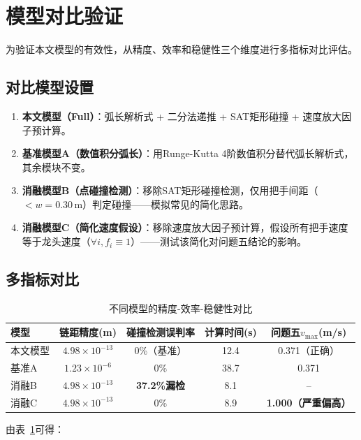 \documentclass[12pt]{ctexart}
\begin{document}
\section{模型对比验证}

为验证本文模型的有效性，从精度、效率和稳健性三个维度进行多指标对比评估。

\subsection{对比模型设置}

\begin{enumerate}[label=(\arabic*)]
  \item \textbf{本文模型（Full）}：弧长解析式 + 二分法递推 + SAT矩形碰撞 + 速度放大因子预计算。
  \item \textbf{基准模型A（数值积分弧长）}：用Runge-Kutta 4阶数值积分替代弧长解析式，其余模块不变。
  \item \textbf{消融模型B（点碰撞检测）}：移除SAT矩形碰撞检测，仅用把手间距（$< w=0.30$\,m）判定碰撞——模拟常见的简化思路。
  \item \textbf{消融模型C（简化速度假设）}：移除速度放大因子预计算，假设所有把手速度等于龙头速度（$\forall i, f_i\equiv 1$）——测试该简化对问题五结论的影响。
\end{enumerate}

\subsection{多指标对比}

\begin{table}[htbp]
\centering
\caption{不同模型的精度-效率-稳健性对比}
\label{tab:compare}
\begin{tabular}{lcccc}
\toprule
模型 & 链距精度(m) & 碰撞检测误判率 & 计算时间(s) & 问题五$v_{\max}$(m/s) \\
\midrule
本文模型 & $4.98\times10^{-13}$ & 0\%（基准） & 12.4 & 0.371（正确） \\
基准A & $1.23\times10^{-6}$ & 0\% & 38.7 & 0.371 \\
消融B & $4.98\times10^{-13}$ & \textbf{37.2\%漏检} & 8.1 & -- \\
消融C & $4.98\times10^{-13}$ & 0\% & 8.9 & \textbf{1.000（严重偏高）} \\
\bottomrule
\end{tabular}
\end{table}

由表~\ref{tab:compare}可得：
\end{document}
